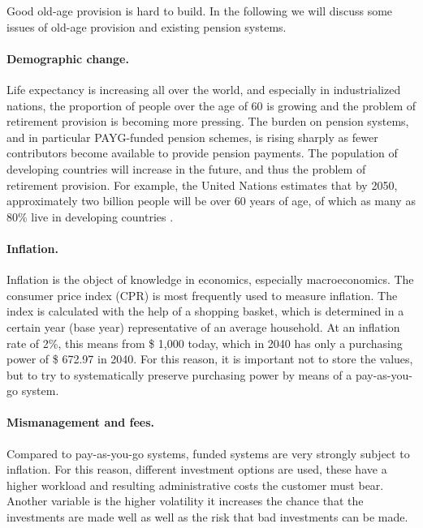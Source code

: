 Good old-age provision is hard to build. In the following we will discuss some issues of old-age provision and existing pension systems.

\paragraph{Demographic change.} Life expectancy is increasing all over the world, and especially in industrialized nations, the proportion of people over the age of 60 is growing and the problem of retirement provision is becoming more pressing. The burden on pension systems, and in particular PAYG-funded pension schemes, is rising sharply as fewer contributors become available to provide pension payments. The population of developing countries will increase in the future, and thus the problem of retirement provision. For example, the United Nations estimates that by 2050, approximately two billion people will be over 60 years of age, of which as many as 80\% live in developing countries
\cite{noauthor_pensions_2009}.



\paragraph{Inflation.}  Inflation is the object of knowledge in economics, especially macroeconomics. The consumer price index (CPR) is most frequently used to measure inflation. The index is calculated with the help of a shopping basket, which is determined in a certain year (base year) representative of an average household. 
At an inflation rate of 2\%, this means from \$ 1,000 today, which in 2040 has only a purchasing power of \$ 672.97 in 2040. 
For this reason, it is important not to store the values, but to try to systematically preserve purchasing power by means of a pay-as-you-go system.

\paragraph{Mismanagement and fees.} Compared to pay-as-you-go systems, funded systems are very strongly subject to inflation. For this reason, different investment options are used, these have a higher workload and resulting administrative costs the customer must bear. Another variable is the higher volatility it increases the chance that the investments are made well as well as the risk that bad investments can be made.


